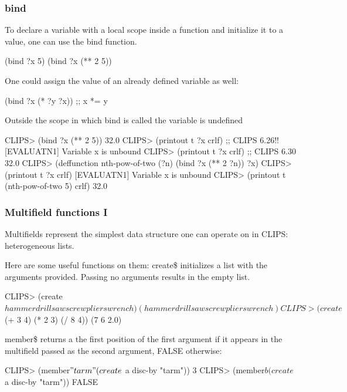 \documentclass[xcolor={usenames,dvipsnames,svgnames}, compress]{beamer}
\begin{document}
\begin{frame}[fragile]
  \frametitle{bind}
  To declare a variable with a local scope inside a function and
  initialize it to a value, one can use the \textsf{bind} function.
  \begin{clips-code}[numbers=none]
    (bind ?x 5)    (bind ?x (** 2 5))
  \end{clips-code}
  One could assign the value of an already defined variable as well:
  \begin{clips-code}[numbers=none]
    (bind ?x (* ?y ?x)) ;; x *= y
  \end{clips-code}
  Outside the scope in which bind is called the variable is undefined
  \begin{clips-code}
    CLIPS> (bind ?x (** 2 5))
    32.0
    CLIPS> (printout t ?x crlf) ;; CLIPS 6.26!!
    [EVALUATN1] Variable x is unbound
    CLIPS> (printout t ?x crlf) ;; CLIPS 6.30
    32.0
    CLIPS> (deffunction nth-pow-of-two (?n) (bind ?x (** 2 ?n)) ?x)
    CLIPS> (printout t ?x crlf)
    [EVALUATN1] Variable x is unbound
    CLIPS> (printout t (nth-pow-of-two 5) crlf)
    32.0
  \end{clips-code}
\end{frame}

\begin{frame}[fragile]
  \frametitle{Multifield functions I}
  Multifields represent the simplest data structure one can operate on
  in CLIPS: heterogeneous lists.\par
  Here are some useful functions on them:
  \textsf{create\$} initializes a list with the arguments provided.
  Passing no arguments results in the empty list.
  \begin{clips-code}
    CLIPS> (create$ hammer drill saw screw pliers wrench)
    (hammer drill saw screw pliers wrench)
    CLIPS> (create$ (+ 3 4) (* 2 3) (/ 8 4))
    (7 6 2.0)
  \end{clips-code}\bigskip
  
  \textsf{member\$} returns a the first position of the
  first argument if it appears in the multifield passed as the second
  argument, FALSE otherwise:
  \begin{clips-code}
    CLIPS> (member$ "tarm" (create$ a disc-by "tarm")) 
    3
    CLIPS> (member$ b (create$ a disc-by "tarm")) 
    FALSE
  \end{clips-code}
\end{frame}


\end{document}
